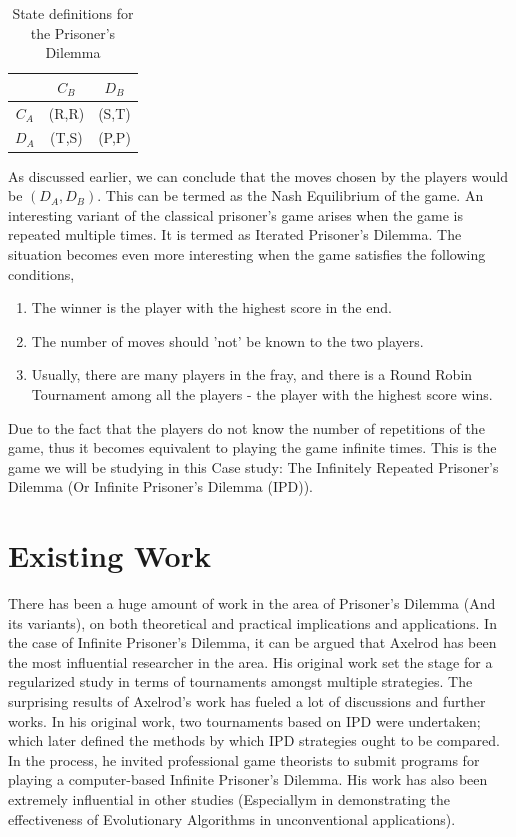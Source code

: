 \documentclass[a4paper]{article}
\begin{document}
	\begin{table}[H]
	\centering
	\begin{tabular}{|c|c|c|}
	\hline
					& $C_{B}$           		& $D_{B}$ 					\\ \hline
	$C_{A}$  		& (R,R) 		 			& (S,T)         			\\ \hline
	$D_{A}$ 		& (T,S)           			& (P,P)            			\\ \hline
	\end{tabular}
	\caption{State definitions for the Prisoner's Dilemma}
	\end{table}

	As discussed earlier, we can conclude that the moves chosen by the players would be $(D_{A},D_{B})$. This can be termed as the Nash Equilibrium of the game. An interesting variant of the classical prisoner's game arises when the game is repeated multiple times. It is termed as Iterated Prisoner's Dilemma. The situation becomes even more interesting when the game satisfies the following conditions,
	\begin{enumerate}
	\item The winner is the player with the highest score in the end.
	\item The number of moves should 'not' be known to the two players.
	\item Usually, there are many players in the fray, and there is a Round Robin Tournament among all the players - the player with the highest score wins.		
	\end{enumerate}
	
	Due to the fact that the players do not know the number of repetitions of the game, thus it becomes equivalent to playing the game infinite times.	This is the game we will be studying in this Case study: The Infinitely Repeated Prisoner's Dilemma (Or Infinite Prisoner's Dilemma (IPD)).
	
	\section{Existing Work}
	
	There has been a huge amount of work in the area of Prisoner's Dilemma (And its variants), on both theoretical and practical implications and applications. In the case of Infinite Prisoner's Dilemma, it can be argued that Axelrod has been the most influential researcher in the area. His original work set the stage for a regularized study in terms of tournaments amongst multiple strategies. The surprising results of Axelrod's work has fueled a lot of discussions and further works. In his original work, two tournaments based on IPD were undertaken; which later defined the methods by which IPD strategies ought to be compared. In the process, he invited professional game theorists to submit programs for playing a computer-based Infinite Prisoner's Dilemma. His work has also been extremely influential in other studies (Especiallym in demonstrating the effectiveness of Evolutionary Algorithms in unconventional applications).
	
\end{document}
